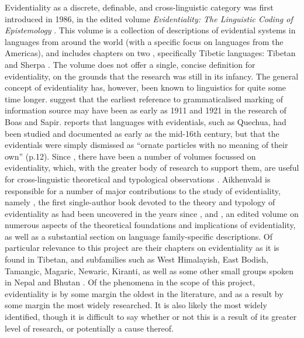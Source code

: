 Evidentiality as a discrete, definable, and cross-linguistic category was first introduced in 1986, in the edited volume \textit{Evidentiality: The Linguistic Coding of Epistemology} \cite{ChafeNichols1986}. This volume is a collection of descriptions of evidential systems in languages from around the world (with a specific focus on languages from the Americas), and includes chapters on two \lfam, specifically Tibetic languages: Tibetan \cite{DeLancey1986} and Sherpa \cite{Woodbury1986}. The volume does not offer a single, concise definition for evidentiality, on the grounds that the research was still in its infancy. The general concept of evidentiality has, however, been known to linguistics for quite some time longer.  suggest that the earliest reference to grammaticalised marking of information source may have been as early as 1911 and 1921 in the research of Boas and Sapir.  reports that languages with evidentials, such as Quechua, had been studied and documented as early as the mid-16th century, but that the evidentials were simply dismissed as ``ornate particles with no meaning of their own'' (p.12). Since , there have been a number of volumes focussed on evidentiality, which, with the greater body of research to support them, are useful for cross-linguistic theoretical and typological observations \cite{DendaleTasmowski2001}. Aikhenvald is responsible for a number of major contributions to the study of evidentiality, namely , the first single-author book devoted to the theory and typology of evidentiality as had been uncovered in the years since , and , an edited volume on numerous aspects of the theoretical foundations and implications of evidentiality, as well as a substantial section on language family-specific descriptions. Of particular relevance to this project are their chapters on evidentiality as it is found in Tibetan, and subfamilies such as West Himalayish, East Bodish, Tamangic, Magaric, Newaric, Kiranti, as well as some other small groups spoken in Nepal and Bhutan \cites{DeLancey2018Evidentiality}{Hyslop2018Evidentiality}. Of the phenomena in the scope of this project, evidentiality is by some margin the oldest in the literature, and as a result by some margin the most widely researched. It is also likely the most widely identified, though it is difficult to say whether or not this is a result of its greater level of research, or potentially a cause thereof.


